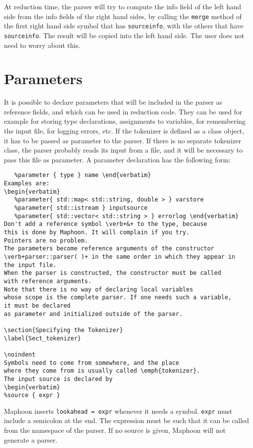 \documentclass{article}
\begin{document}
At reduction time, the parser will try to 
compute the info field of the left hand side from the info fields 
of the right hand sides, by calling the \verb+merge+ method
of the first right hand side symbol that has \verb+sourceinfo+, 
with the others that have \verb+sourceinfo+. 
The result will be copied into the left hand side.
The user does not need to worry about this. 

\section{Parameters}
\label{Sect_parameters}

\noindent
It is possible to declare parameters 
that will be included in the parser as reference fields, and
which can be used in reduction code. 
They can be used for example for storing type declarations,
assignments to variables, for remembering the input file,
for logging errors, etc. 
If the tokenizer is defined as a class object, it has to be passed
as parameter to the parser. If there is no separate tokenizer class, 
the parser probably reads its input from a file, 
and it will be necessary to pass this
file as parameter. 
A parameter declaration has the following form:
\begin{verbatim}
   %parameter { type } name \end{verbatim}
Examples are: 
\begin{verbatim}
   %parameter{ std::map< std::string, double > } varstore
   %parameter{ std::istream } inputsource 
   %parameter{ std::vector< std::string > } errorlog \end{verbatim}
Don't add a reference symbol \verb+&+ to the type, because 
this is done by Maphoon. It will complain if you try. 
Pointers are no problem. 
The parameters become reference arguments of the constructor
\verb+parser::parser( )+ in the same order in which they appear in
the input file.
When the parser is constructed, the constructor must be called 
with reference arguments. 
Note that there is no way of declaring local variables 
whose scope is the complete parser. If one needs such a variable, 
it must be declared
as parameter and initialized outside of the parser.

\section{Specifying the Tokenizer}
\label{Sect_tokenizer}

\noindent
Symbols need to come from somewhere, and the place
where they come from is usually called \emph{tokenizer}.
The input source is declared by 
\begin{verbatim}
%source { expr }   
\end{verbatim}
Maphoon inserts \verb+lookahead = expr+ whenever it needs
a symbol. \verb+expr+ must include a semicolon at the end. 
The expression must be such that it can be called from the namespace
of the parser. 
If no source is given,
Maphoon will not generate a parser.
\end{document}
